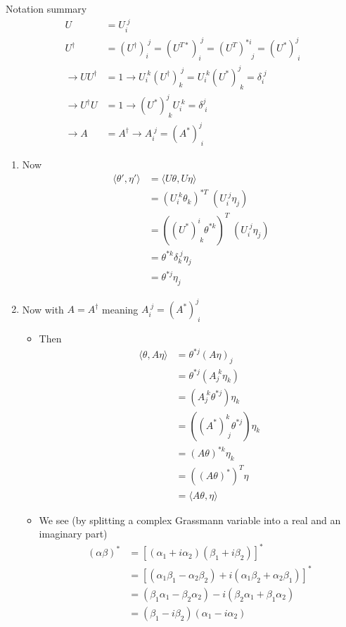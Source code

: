 \documentclass[10pt,a4paper]{article}
\theoremstyle{definition}
\begin{document}
Notation summary
\begin{align}
U
&=U_i^{\;j}\\
U^\dagger
&=(U^\dagger)_i^{\;j}
=(U^{T*})_i^{\;j}
=(U^{T})^{*i}_{\;\;\;j}
=(U^*)^{j}_{\;i}\\
\rightarrow UU^\dagger&=1\rightarrow U_i^{\;k}(U^\dagger)_k^{\;j}=U_i^{\;k}(U^*)^j_{\;k}=\delta_i^{\;j}\\
\rightarrow U^\dagger U&=1\rightarrow (U^*)^{j}_{\;k}U_i^{\;k}=\delta_{\;i}^{j}\\
\rightarrow A&=A^\dagger \rightarrow A_i^{\;j}=(A^*)^{j}_{\;i}
\end{align}

\begin{enumerate}
\item Now
\begin{align}
\langle\theta',\eta'\rangle
&=\langle U\theta,U\eta\rangle\\
&=(U_i^{\;k}\theta_k)^{*T}\;(U_i^{\;j}\eta_j)\\
&=((U^*)_{\;k}^{i}\theta^{*k})^T\;(U_i^{\;j}\eta_j)\\
&=\theta^{*k}\delta^{\;j}_k\eta_j\\
&=\theta^{*j}\eta_j
\end{align}
\item Now with $A=A^\dagger$ meaning $A_i^{\;j}=(A^*)^{j}_{\;i}$
\begin{itemize}
\item Then
\begin{align}
\langle\theta,A\eta\rangle
&=\theta^{*j}(A\eta)_j\\
&=\theta^{*j}(A_j^{\;k}\eta_k)\\
&=(A_j^{\;k}\theta^{*j})\eta_k\\
&=((A^*)^k_{\;j}\theta^{*j})\eta_k\\
&=(A\theta)^{*k}\eta_k\\
&=((A\theta)^*)^T\eta\\
&=\langle A\theta,\eta\rangle
\end{align}
\item We see (by splitting a complex Grassmann variable into a real and an imaginary part)
\begin{align}
(\alpha\beta)^*&=[(\alpha_1+i\alpha_2)(\beta_1+i\beta_2)]^*\\
&=[(\alpha_1\beta_1-\alpha_2\beta_2)+i(\alpha_1\beta_2+\alpha_2\beta_1)]^*\\
&=(\beta_1\alpha_1-\beta_2\alpha_2)-i(\beta_2\alpha_1+\beta_1\alpha_2)\\
&=(\beta_1-i\beta_2)(\alpha_1-i\alpha_2)\\

\end{align}
\end{itemize}
\end{enumerate}
\end{document}
